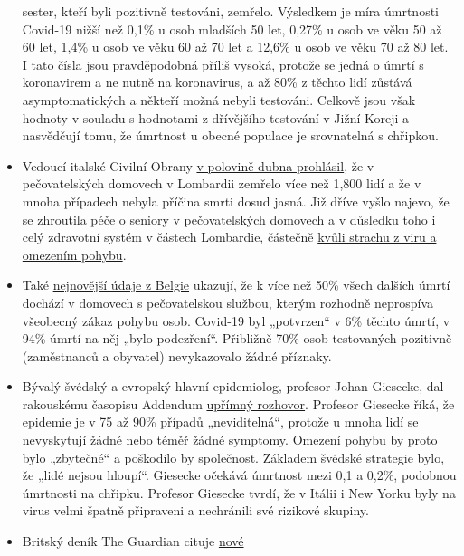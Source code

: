 \begin{itemize}
  sester, kteří byli pozitivně testováni, zemřelo. Výsledkem je míra
  úmrtnosti Covid-19 nižší než 0,1\% u osob mladších 50 let, 0,27\% u
  osob ve věku 50 až 60 let, 1,4\% u osob ve věku 60 až 70 let a 12,6\%
  u osob ve věku 70 až 80 let. I tato čísla jsou pravděpodobná příliš
  vysoká, protože se jedná o úmrtí s koronavirem a ne nutně na
  koronavirus, a až 80\% z těchto lidí zůstává asymptomatických a
  někteří možná nebyli testováni. Celkově jsou však hodnoty v souladu s
  hodnotami z dřívějšího testování v Jižní Koreji a nasvědčují tomu, že
  úmrtnost u obecné populace je srovnatelná s chřipkou.
\item
  Vedoucí italské Civilní Obrany
  \href{https://www.theguardian.com/world/2020/apr/16/italian-police-broaden-care-home-coronavirus-milan}{v
  polovině dubna prohlásil}, že v pečovatelských domovech v Lombardii
  zemřelo více než 1,800 lidí a že v mnoha případech nebyla příčina
  smrti dosud jasná. Již dříve vyšlo najevo, že se zhroutila péče o
  seniory v pečovatelských domovech a v důsledku toho i celý zdravotní
  systém v částech Lombardie, částečně
  \href{https://swprs.org/covid-19-a-report-from-italy/}{kvůli strachu z
  viru a omezením pohybu}.
\item
  Také
  \href{https://covid-19.sciensano.be/sites/default/files/Covid19/Meest\%20recente\%20update.pdf}{nejnovější
  údaje z Belgie} ukazují, že k více než 50\% všech dalších úmrtí
  dochází v domovech s pečovatelskou službou, kterým rozhodně neprospíva
  všeobecný zákaz pohybu osob. Covid-19 byl „potvrzen`` v 6\% těchto
  úmrtí, v 94\% úmrtí na něj „bylo podezření``. Přibližně 70\% osob
  testovaných pozitivně (zaměstnanců a obyvatel) nevykazovalo žádné
  příznaky.
\item
  Bývalý švédský a evropský hlavní epidemiolog, profesor Johan Giesecke,
  dal rakouskému časopisu Addendum
  \href{https://www.addendum.org/coronavirus/interview-johan-giesecke/}{upřímný
  rozhovor}. Profesor Giesecke říká, že epidemie je v 75 až 90\% případů
  „neviditelná``, protože u mnoha lidí se nevyskytují žádné nebo téměř
  žádné symptomy. Omezení pohybu by proto bylo „zbytečné`` a poškodilo
  by společnost. Základem švédské strategie bylo, že „lidé nejsou
  hloupí``. Giesecke očekává úmrtnost mezi 0,1 a 0,2\%, podobnou
  úmrtnosti na chřipku. Profesor Giesecke tvrdí, že v Itálii i New Yorku
  byly na virus velmi špatně připraveni a nechránili své rizikové
  skupiny.
\item
  Britský deník The Guardian cituje
  \href{https://www.theguardian.com/environment/2020/apr/20/air-pollution-may-be-key-contributor-to-covid-19-deaths-study?utm_medium}{nové
}
\end{itemize}
